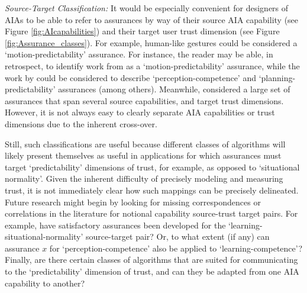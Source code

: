 \emph{Source-Target Classification:}
It would be especially convenient for designers of AIAs to be able to refer to assurances by way of their source AIA capability (see Figure \ref{fig:AIcapabilities}) and their target user trust dimension (see Figure \ref{fig:Assurance_classes}). 
For example, human-like gestures could be considered a `motion-predictability' assurance. For instance, the reader may be able, in retrospect, to identify work from \cite{Dragan2013-wd} as a `motion-predictability' assurance, while the work by \citet{Wang2016-id} could be considered to describe `perception-competence' and `planning-predictability' assurances (among others). Meanwhile, \citet{Aitken2016-fb} considered a large set of assurances that span several source capabilities, and target trust dimensions. %
However, it is not always easy to clearly separate AIA capabilities or trust dimensions due to the inherent cross-over.  %

Still, such classifications are useful because different classes of algorithms will likely present themselves as useful in applications for which assurances must target `predictability' dimensions of trust, for example, as opposed to `situational normality'. 
Given the inherent difficulty of precisely modeling and measuring trust, it is not immediately clear how such mappings can be precisely delineated.  
Future research might begin by looking for missing correspondences or correlations in the literature for notional capability source-trust target pairs. For example, have satisfactory assurances been developed for the `learning-situational-normality' source-target pair? Or, to what extent (if any) can assurance $x$ for `perception-competence' also be applied to `learning-competence'? Finally, are there certain classes of algorithms that are suited for communicating to the `predictability' dimension of trust, and can they be adapted from one AIA capability to another?
